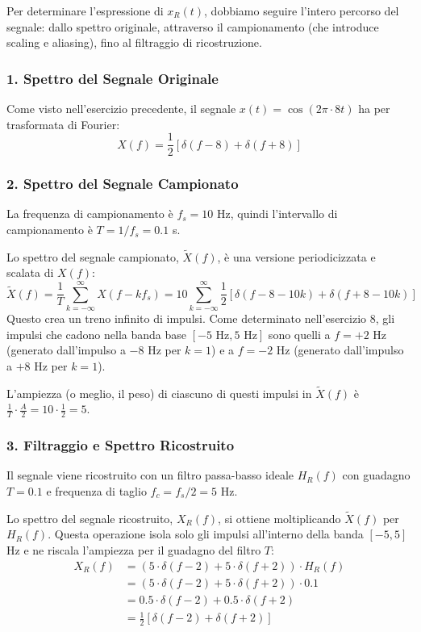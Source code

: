 
\begin{soluzione}{9}
    Per determinare l'espressione di $x_R(t)$, dobbiamo seguire l'intero percorso del segnale: dallo spettro originale, attraverso il campionamento (che introduce scaling e aliasing), fino al filtraggio di ricostruzione.

    \subsubsection*{1. Spettro del Segnale Originale}
    Come visto nell'esercizio precedente, il segnale $x(t) = \cos(2\pi \cdot 8t)$ ha per trasformata di Fourier:
    \[
        X(f) = \frac{1}{2} \left[ \delta(f - 8) + \delta(f + 8) \right]
    \]

    \subsubsection*{2. Spettro del Segnale Campionato}
    La frequenza di campionamento è $f_s = 10$ Hz, quindi l'intervallo di campionamento è $T = 1/f_s = 0.1$ s.
    
    Lo spettro del segnale campionato, $\tilde{X}(f)$, è una versione periodicizzata e scalata di $X(f)$:
    \[
        \tilde{X}(f) = \frac{1}{T} \sum_{k=-\infty}^{\infty} X(f - k f_s) = 10 \sum_{k=-\infty}^{\infty} \frac{1}{2} \left[ \delta(f - 8 - 10k) + \delta(f + 8 - 10k) \right]
    \]
    Questo crea un treno infinito di impulsi. Come determinato nell'esercizio 8, gli impulsi che cadono nella banda base $[-5 \text{ Hz}, 5 \text{ Hz}]$ sono quelli a $f=+2$ Hz (generato dall'impulso a $-8$ Hz per $k=1$) e a $f=-2$ Hz (generato dall'impulso a $+8$ Hz per $k=1$).
    
    L'ampiezza (o meglio, il peso) di ciascuno di questi impulsi in $\tilde{X}(f)$ è $\frac{1}{T} \cdot \frac{A}{2} = 10 \cdot \frac{1}{2} = 5$.
    
    \subsubsection*{3. Filtraggio e Spettro Ricostruito}
    Il segnale viene ricostruito con un filtro passa-basso ideale $H_R(f)$ con guadagno $T=0.1$ e frequenza di taglio $f_c = f_s/2 = 5$ Hz.
    
    Lo spettro del segnale ricostruito, $X_R(f)$, si ottiene moltiplicando $\tilde{X}(f)$ per $H_R(f)$. Questa operazione isola solo gli impulsi all'interno della banda $[-5, 5]$ Hz e ne riscala l'ampiezza per il guadagno del filtro $T$:
    \begin{align*}
        X_R(f) &= \left( 5 \cdot \delta(f - 2) + 5 \cdot \delta(f + 2) \right) \cdot H_R(f) \\
        &= \left( 5 \cdot \delta(f - 2) + 5 \cdot \delta(f + 2) \right) \cdot 0.1 \\
        &= 0.5 \cdot \delta(f - 2) + 0.5 \cdot \delta(f + 2) \\
        &= \frac{1}{2} \left[ \delta(f - 2) + \delta(f + 2) \right]
    \end{align*}
    

\end{soluzione}
